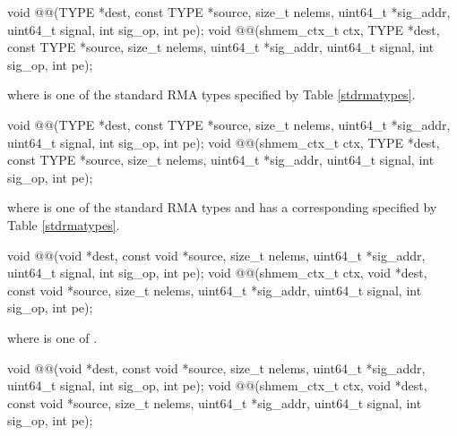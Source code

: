 \color{ForestGreen}

\begin{apidefinition}

\begin{C11synopsis}
void @@(TYPE *dest, const TYPE *source, size_t nelems, uint64_t *sig_addr, uint64_t signal, int sig_op, int pe);
void @@(shmem_ctx_t ctx, TYPE *dest, const TYPE *source, size_t nelems, uint64_t *sig_addr, uint64_t signal, int sig_op, int pe);
\end{C11synopsis}
where \TYPE{} is one of the standard \ac{RMA} types specified by Table \ref{stdrmatypes}.

\begin{Csynopsis}
void @@(TYPE *dest, const TYPE *source, size_t nelems, uint64_t *sig_addr, uint64_t signal, int sig_op, int pe);
void @@(shmem_ctx_t ctx, TYPE *dest, const TYPE *source, size_t nelems, uint64_t *sig_addr, uint64_t signal, int sig_op, int pe);
\end{Csynopsis}
where \TYPE{} is one of the standard \ac{RMA} types and has a corresponding \TYPENAME{} specified by Table \ref{stdrmatypes}.

\begin{CsynopsisCol}
void @@(void *dest, const void *source, size_t nelems, uint64_t *sig_addr, uint64_t signal, int sig_op, int pe);
void @@(shmem_ctx_t ctx, void *dest, const void *source, size_t nelems, uint64_t *sig_addr, uint64_t signal, int sig_op, int pe);
\end{CsynopsisCol}
where \SIZE{} is one of .

\begin{CsynopsisCol}
void @@(void *dest, const void *source, size_t nelems, uint64_t *sig_addr, uint64_t signal, int sig_op, int pe);
void @@(shmem_ctx_t ctx, void *dest, const void *source, size_t nelems, uint64_t *sig_addr, uint64_t signal, int sig_op, int pe);
\end{CsynopsisCol}


\end{apidefinition}
